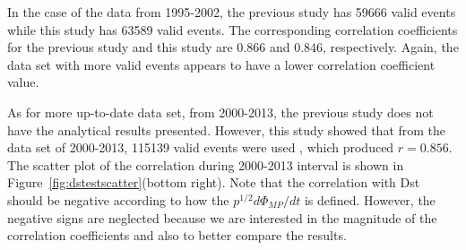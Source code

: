 \documentclass[12pt]{report} %
\begin{document}
In the case of the data from 1995-2002, the previous study has 59666 valid events while this study has 63589 valid events. The corresponding correlation coefficients for the previous study and this study are $0.866$ and $0.846$, respectively. Again, the data set with more valid events appears to have a lower correlation coefficient value. 

As for more up-to-date data set, from 2000-2013, the previous study does not have the analytical results presented. However, this study showed that from the data set of 2000-2013, 115139 valid events were used , which produced $r= 0.856$. The scatter plot of the correlation during 2000-2013 interval is shown in Figure~\ref{fig:dstestscatter}(bottom right). Note that the correlation with Dst should be negative according to how the $p^{1/2}d\Phi_{MP}/dt$ is defined. However, the negative signs are neglected because we are interested in the magnitude of the correlation coefficients and also to better compare the results.
\end{document}
